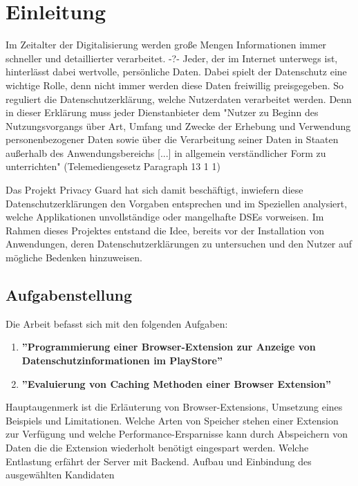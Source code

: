 \chapter{Einleitung}
\label{c:einleitung}

Im Zeitalter der Digitalisierung werden große Mengen Informationen immer schneller und detaillierter verarbeitet. -?-  Jeder, der im Internet unterwegs ist, hinterlässt dabei wertvolle, persönliche Daten. Dabei spielt der Datenschutz eine wichtige Rolle, denn nicht immer werden diese Daten freiwillig preisgegeben. So reguliert die Datenschutzerklärung, welche Nutzerdaten verarbeitet werden. Denn in dieser Erklärung muss jeder Dienstanbieter dem "Nutzer zu Beginn des Nutzungsvorgangs über Art, Umfang und Zwecke der Erhebung und Verwendung personenbezogener Daten sowie über die Verarbeitung seiner Daten in Staaten außerhalb des Anwendungsbereichs [...] in allgemein verständlicher Form zu unterrichten"  (Telemediengesetz Paragraph 13 1 1)

Das Projekt Privacy Guard hat sich damit beschäftigt, inwiefern diese Datenschutzerklärungen den Vorgaben entsprechen und im Speziellen analysiert, welche Applikationen unvollständige oder mangelhafte DSEs vorweisen. Im Rahmen dieses Projektes entstand die Idee, bereits vor der Installation von Anwendungen, deren Datenschutzerklärungen zu untersuchen und den Nutzer auf mögliche Bedenken hinzuweisen.

\section{Aufgabenstellung}
\label{s:aufgabenstellung}

Die Arbeit befasst sich mit den folgenden Aufgaben:
\begin{enumerate}
	\item \textbf{''Programmierung einer Browser-Extension zur Anzeige von Datenschutzinformationen im PlayStore''}
	\item \textbf{''Evaluierung von Caching Methoden einer Browser Extension''}
\end{enumerate}

Hauptaugenmerk ist die Erläuterung von Browser-Extensions, Umsetzung eines Beispiels und Limitationen.
Welche Arten von Speicher stehen einer Extension zur Verfügung und welche Performance-Ersparnisse kann durch Abspeichern von Daten die die Extension wiederholt benötigt eingespart werden. Welche Entlastung erfährt der Server mit Backend. Aufbau und Einbindung des ausgewählten Kandidaten


